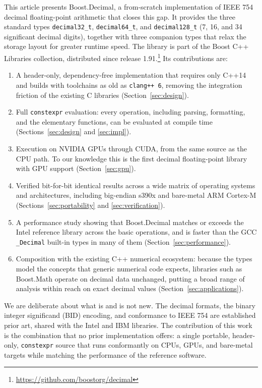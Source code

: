 \documentclass[acmsmall]{acmart}
\begin{document}
This article presents Boost.Decimal, a from-scratch implementation of IEEE 754
decimal floating-point arithmetic that closes this gap. It provides the three
standard types \texttt{decimal32\_t}, \texttt{decimal64\_t}, and
\texttt{decimal128\_t} (7, 16, and 34 significant decimal digits), together with
three companion types that relax the storage layout for greater runtime speed. The
library is part of the Boost C++ Libraries collection, distributed since release
1.91.\footnote{\url{https://github.com/boostorg/decimal}} Its contributions are:

\begin{enumerate}
\item A header-only, dependency-free implementation that requires only C++14 and
  builds with toolchains as old as \texttt{clang++ 6}, removing the integration
  friction of the existing C libraries (Section~\ref{sec:design}).
\item Full \texttt{constexpr} evaluation: every operation, including parsing,
  formatting, and the elementary functions, can be evaluated at compile time
  (Sections~\ref{sec:design} and \ref{sec:impl}).
\item Execution on NVIDIA GPUs through CUDA, from the same source as the CPU
  path. To our knowledge this is the first decimal floating-point library with
  GPU support (Section~\ref{sec:gpu}).
\item Verified bit-for-bit identical results across a wide matrix of operating
  systems and architectures, including big-endian s390x and bare-metal ARM
  Cortex-M (Sections~\ref{sec:portability} and \ref{sec:verification}).
\item A performance study showing that Boost.Decimal matches or exceeds the Intel
  reference library across the basic operations, and is faster than the GCC
  \texttt{\_Decimal} built-in types in many of them (Section~\ref{sec:performance}).
\item Composition with the existing C++ numerical ecosystem: because the types model
  the concepts that generic numerical code expects, libraries such as Boost.Math operate
  on decimal data unchanged, putting a broad range of analysis within reach on exact
  decimal values (Section~\ref{sec:applications}).
\end{enumerate}

We are deliberate about what is and is not new. The decimal formats, the binary
integer significand (BID) encoding, and conformance to IEEE 754 are established
prior art, shared with the Intel and IBM libraries. The contribution of this work
is the combination that no prior implementation offers: a single portable,
header-only, \texttt{constexpr} source that runs conformantly on CPUs, GPUs, and
bare-metal targets while matching the performance of the reference software.
\end{document}
